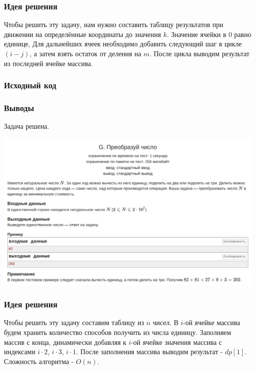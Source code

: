 \subsubsection*{Идея решения}

Чтобы решить эту задачу, нам нужно составить таблицу результатов при движении на определённые координаты до значения $k$. Значение ячейки в 0 равно единице,
Для дальнейших ячеек необходимо добавить следующий шаг в цикле $(i - j)$, а затем взять остаток от деления на $m$. После цикла выводим результат из последней ячейке массива.

\subsubsection*{Исходный код}


\subsubsection*{Выводы}
Задача решена.

\begin{center}
\includegraphics[width=\textwidth]{statements/Contest3G.png}
\end{center}

\subsubsection*{Идея решения}

Чтобы решить эту задачу составим таблицу из $n$ чисел. В $i$-ой ячейке массива будем хранить количество способов получить из числа единицу.
Заполняем массив с конца, динамически добавляя к $i$-ой ячейке значения массива с индексами $i\cdot2$, $i\cdot3$, $i\cdot1$. 
После заполнения массива выводим результат - $dp[1]$.
Сложность алгоритма - $O(n)$.

